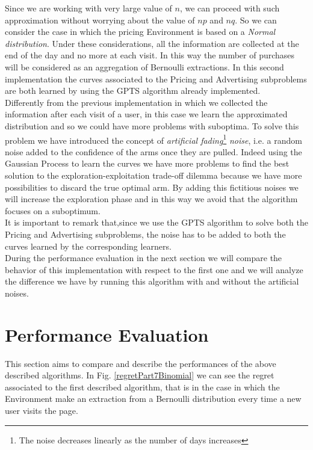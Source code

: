 Since we are working with very large value of $n$, we can proceed with such approximation without worrying about the value of $np$ and $nq$.
So we can consider the case in which the pricing Environment is based on a \textit{Normal distribution}. Under these considerations, all the information are collected at the end of the day and no more at each visit. In this way the number of purchases will be considered as an aggregation of Bernoulli extractions.
In this second implementation the curves associated to the Pricing and Advertising subproblems are both learned by using the GPTS algorithm already implemented.\\
Differently from the previous implementation in which we collected the information after each visit of a user, in this case we learn the approximated distribution and so we could have more problems with suboptima. To solve this problem we have introduced the concept of \textit{artificial fading}\footnote{The noise decreases linearly as the number of days increases} \textit{noise}, i.e. a random noise added to the confidence of the arms once they are pulled. Indeed using the Gaussian Process to learn the curves we have more problems to find the best solution to the exploration-exploitation trade-off dilemma because we have more possibilities to discard the true optimal arm. By adding this fictitious noises we will increase the exploration phase and in this way we avoid that the algorithm focuses on a suboptimum.\\ It is important to remark that,since we use the GPTS algorithm to solve both the Pricing and Advertising subproblems, the noise has to be added to both the curves learned by the corresponding learners.\\ During the performance evaluation in the next section we will compare the behavior of this implementation with respect to the first one and we will analyze the difference we have by running this algorithm with and without the artificial noises.


\section{Performance Evaluation}
This section aims to compare and describe the performances of the above described algorithms. In Fig. \ref{regretPart7Binomial} we can see the regret associated to the first described algorithm, that is in the case in which the Environment make an extraction from a Bernoulli distribution every time a new user visits the page.

